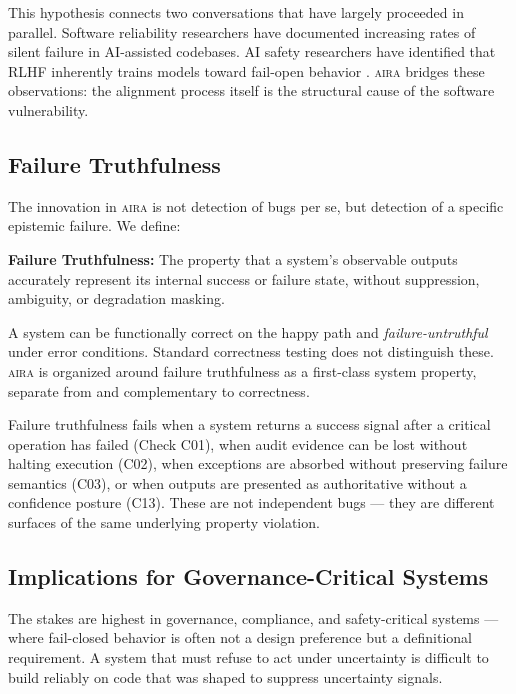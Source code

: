 \documentclass[11pt]{article}
\newenvironment{definitionbox}{%
  \begin{tcolorbox}[
    enhanced,
    colback=aira-light!60,
    colframe=aira-blue,
    arc=2pt,
    left=8pt, right=8pt, top=6pt, bottom=6pt
  ]
}{%
  \end{tcolorbox}
}
\newcommand{\aira}{\textsc{aira}}
\begin{document}
This hypothesis connects two conversations that have largely proceeded in parallel. Software
reliability researchers have documented increasing rates of silent failure in AI-assisted
codebases. AI safety researchers have identified that RLHF inherently trains models toward
fail-open behavior \citep{casper2023open}. \aira{} bridges these observations: the alignment
process itself is the structural cause of the software vulnerability.

\subsection{Failure Truthfulness}
\label{sec:failure-truthfulness}

The innovation in \aira{} is not detection of bugs per se, but detection of a specific
epistemic failure. We define:

\begin{definitionbox}
  \textbf{Failure Truthfulness:} The property that a system's observable outputs accurately
  represent its internal success or failure state, without suppression, ambiguity, or
  degradation masking.
\end{definitionbox}

A system can be functionally correct on the happy path and \emph{failure-untruthful} under
error conditions. Standard correctness testing does not distinguish these. \aira{} is
organized around failure truthfulness as a first-class system property, separate from and
complementary to correctness.

Failure truthfulness fails when a system returns a success signal after a critical operation
has failed (Check C01), when audit evidence can be lost without halting execution (C02), when
exceptions are absorbed without preserving failure semantics (C03), or when outputs are
presented as authoritative without a confidence posture (C13). These are not independent bugs
--- they are different surfaces of the same underlying property violation.

\subsection{Implications for Governance-Critical Systems}

The stakes are highest in governance, compliance, and safety-critical systems --- where
fail-closed behavior is often not a design preference but a definitional requirement. A
system that must refuse to act under uncertainty is difficult to build reliably on code that
was shaped to suppress uncertainty signals.
\end{document}
